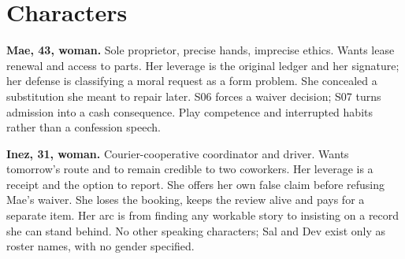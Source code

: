 \section{Characters}
\textbf{Mae, 43, woman.} Sole proprietor, precise hands, imprecise ethics. Wants lease renewal and access to parts. Her leverage is the original ledger and her signature; her defense is classifying a moral request as a form problem. She concealed a substitution she meant to repair later. S06 forces a waiver decision; S07 turns admission into a cash consequence. Play competence and interrupted habits rather than a confession speech.

\textbf{Inez, 31, woman.} Courier-cooperative coordinator and driver. Wants tomorrow's route and to remain credible to two coworkers. Her leverage is a receipt and the option to report. She offers her own false claim before refusing Mae's waiver. She loses the booking, keeps the review alive and pays for a separate item. Her arc is from finding any workable story to insisting on a record she can stand behind. No other speaking characters; Sal and Dev exist only as roster names, with no gender specified.
